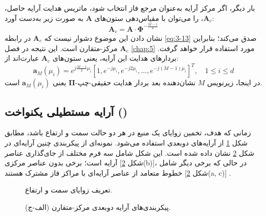 بار دیگر، اگر مرکز آرایه به‌عنوان مرجع فاز انتخاب شود، ماتریس هدایت آرایه حاصل، $\bm{A}_c$، را می‌توان با مقیاس‌دهی ستون‌های $\bm{A}$ به صورت زیر به‌دست آورد:
\begin{equation}
	\bm{A}_c = \bm{A} \cdot \bm{\Phi}^{-\frac{M-1}{2}}
	\label{eq:3-23}
\end{equation}
نشان دادن این موضوع دشوار نیست که $\bm{A}_c$ در رابطه \eqref{eq:3-13} صدق می‌کند؛ بنابراین $\bm{A}_c$ مرکز-متقارن است. این نتیجه در فصل \ref{chap:5} مورد استفاده قرار خواهد گرفت. بردارهای هدایت این آرایه، یعنی ستون‌های $\bm{A}_c$ عبارت‌اند از:
\begin{equation}
	\bm{a}_M(\mu_i) = e^{j\frac{M-1}{2}\mu_i} [1, e^{-j\mu_i}, e^{-j2\mu_i}, \dots, e^{-j(M-1)\mu_i}]^T, \quad 1 \leq i \leq d
	\label{eq:3-24}
\end{equation}
در اینجا، زیرنویس $M$ نشان‌دهنده بعد بردار هدایت حقیقی-چپ-$\bm{\Pi}$ یعنی $\bm{a}_M(\mu_i)$ است.

\subsection{آرایه مستطیلی یکنواخت ()}
\label{subsec:3-3-2}
زمانی که هدف، تخمین زوایای یک منبع در هر دو حالت سمت و ارتفاع باشد، مطابق شکل \ref{fig:3-3} از آرایه‌های دوبعدی استفاده می‌شود. نمونه‌ای از پیکربندی چنین آرایه‌ای در شکل \ref{fig:3-4} نشان داده شده است. این شکل شامل سه فرم مختلف از جای‌گذاری عناصر آرایه است؛ برخی بدون عناصر مرکزی [شکل \ref{fig:3-4}(b)]، در حالی که برخی دیگر شامل خطوط متعامد از عناصر آرایه‌ای با مراکز فاز مشترک هستند [شکل \ref{fig:3-4}(a, c)] \cite{6}.

\begin{figure}[ht]
	\centering
	\caption{تعریف زوایای سمت و ارتفاع.}
	\label{fig:3-3}
\end{figure}

\begin{figure}[ht]
	\centering
	\caption{پیکربندی‌های آرایه دوبعدی مرکز-متقارن (الف-ج).}
	\label{fig:3-4}
\end{figure}


